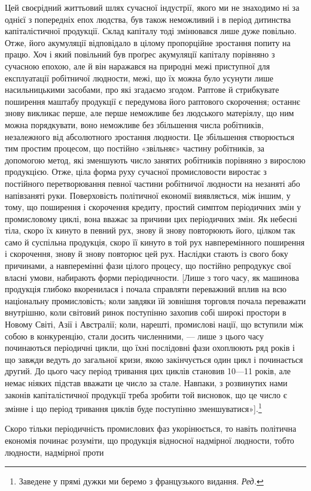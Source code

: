 Цей своєрідний життьовий шлях сучасної індустрії, якого ми не
знаходимо ні за однієї з попередніх епох людства, був також
неможливий і в період дитинства капіталістичної продукції. Склад
капіталу тоді змінювався лише дуже повільно. Отже, його акумуляції
відповідало в цілому пропорційне зростання попиту на
працю. Хоч і який повільний був проґрес акумуляції капіталу
порівняно з сучасною епохою, але й він наражався на природні
межі приступної для експлуатації робітничої людности, межі, що
їх можна було усунути лише насильницькими засобами, про які
згадаємо згодом. Раптове й стрибкувате поширення маштабу
продукції є передумова його раптового скорочення; останнє
знову викликає перше, але перше неможливе без людського
матеріялу, що ним можна порядкувати, воно неможливе без
збільшення числа робітників, незалежного від абсолютного зростання
людности. Це збільшення створюється тим простим процесом,
що постійно «звільняє» частину робітників, за допомогою
метод, які зменшують число занятих робітників порівняно з
вирослою продукцією. Отже, ціла форма руху сучасної промисловости
виростає з постійного перетворювання певної частини
робітничої людности на незаняті або напівзаняті руки. Поверховість
політичної економії виявляється, між іншим, у тому, що
поширення і скорочення кредиту, простий симптом періодичних
змін у промисловому циклі, вона вважає за причини цих періодичних
змін. Як небесні тіла, скоро їх кинуто в певний рух,
знову й знову повторюють його, цілком так само й суспільна
продукція, скоро її кинуто в той рух навперемінного поширення
і скорочення, знову й знову повторює цей рух. Наслідки стають
із свого боку причинами, а навперемінні фази цілого процесу,
що постійно репродукує свої власні умови, набирають форми періодичности.
[Лише з того часу, як машинова продукція глибоко
вкоренилася і почала справляти переважний вплив на всю національну
промисловість; коли завдяки їй зовнішня торговля
почала переважати внутрішню, коли світовий ринок поступінно
захопив собі широкі простори в Новому Світі, Азії і Австралії;
коли, нарешті, промислові нації, що вступили між собою в конкуренцію,
стали досить численними, — лише з цього часу починаються
періодичні цикли, що їхні послідовні фази охоплюють
ряд років і що завжди ведуть до загальної кризи, якою закінчується
один цикл і починається другий. До цього часу період
тривання цих циклів становив 10—11 років, але немає ніяких
підстав вважати це число за стале. Навпаки, з розвинутих нами
законів капіталістичної продукції треба зробити той висновок,
що це число є змінне і що період тривання циклів буде поступінно
зменшуватися»].\footnote*{
Заведене у прямі дужки ми беремо з французького видання. \emph{Ред.}
}

Скоро тільки періодичність промислових фаз укорінюється,
то навіть політична економія починає розуміти, що продукція
відносної надмірної людности, тобто людности, надмірної проти
\parbreak{}  %

